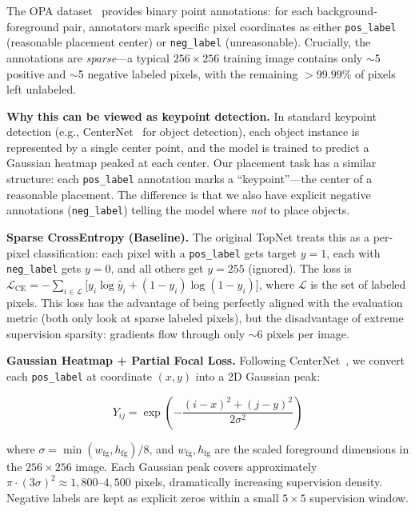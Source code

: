 \documentclass[10pt,twocolumn]{article}
\begin{document}
The OPA dataset~\cite{liu2021OPA} provides binary point annotations: for each background-foreground pair, annotators mark specific pixel coordinates as either \texttt{pos\_label} (reasonable placement center) or \texttt{neg\_label} (unreasonable). Crucially, the annotations are \textit{sparse}---a typical $256\times 256$ training image contains only $\sim$5 positive and $\sim$5 negative labeled pixels, with the remaining $>99.99\%$ of pixels left unlabeled.

\textbf{Why this can be viewed as keypoint detection.} In standard keypoint detection (e.g., CenterNet~\cite{centernet} for object detection), each object instance is represented by a single center point, and the model is trained to predict a Gaussian heatmap peaked at each center. Our placement task has a similar structure: each \texttt{pos\_label} annotation marks a ``keypoint''---the center of a reasonable placement. The difference is that we also have explicit negative annotations (\texttt{neg\_label}) telling the model where \textit{not} to place objects.

\textbf{Sparse CrossEntropy (Baseline).} The original TopNet treats this as a per-pixel classification: each pixel with a \texttt{pos\_label} gets target $y=1$, each with \texttt{neg\_label} gets $y=0$, and all others get $y=255$ (ignored). The loss is $\mathcal{L}_{\text{CE}} = -\sum_{i \in \mathcal{L}} \big[y_i \log \hat{y}_i + (1-y_i)\log(1-\hat{y}_i)\big]$, where $\mathcal{L}$ is the set of labeled pixels. This loss has the advantage of being perfectly aligned with the evaluation metric (both only look at sparse labeled pixels), but the disadvantage of extreme supervision sparsity: gradients flow through only $\sim$6 pixels per image.

\textbf{Gaussian Heatmap + Partial Focal Loss.} Following CenterNet~\cite{centernet}, we convert each \texttt{pos\_label} at coordinate $(x,y)$ into a 2D Gaussian peak:

\begin{equation}
Y_{ij} = \exp\left(-\frac{(i - x)^2 + (j - y)^2}{2\sigma^2}\right)
\end{equation}

where $\sigma = \min(w_{\text{fg}}, h_{\text{fg}}) / 8$, and $w_{\text{fg}}, h_{\text{fg}}$ are the scaled foreground dimensions in the $256\times 256$ image. Each Gaussian peak covers approximately $\pi \cdot (3\sigma)^2 \approx 1{,}800$--$4{,}500$ pixels, dramatically increasing supervision density. Negative labels are kept as explicit zeros within a small $5\times 5$ supervision window.
\end{document}
